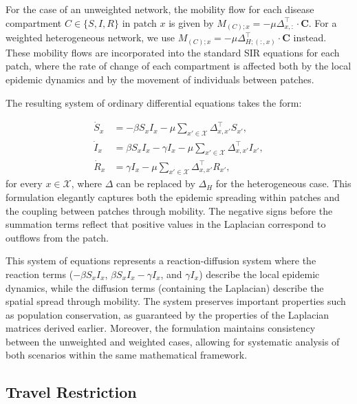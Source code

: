 For the case of an unweighted network, the mobility flow for each disease compartment $C \in \{S, I, R\}$ in patch $x$ is given by $M_{(C);x} = -\mu \Delta_{x,:}^{\top} \cdot \mathbf{C}$. For a weighted heterogeneous network, we use $M_{(C);x} = -\mu \Delta_{H;(:,x)}^{\top} \cdot \mathbf{C}$ instead. These mobility flows are incorporated into the standard SIR equations for each patch, where the rate of change of each compartment is affected both by the local epidemic dynamics and by the movement of individuals between patches.

The resulting system of ordinary differential equations takes the form:

\begin{equation}
\begin{aligned}
    \dot{S}_{x} &= -\beta S_{x} I_{x} - \mu \sum_{x' \in \mathcal{X}} \Delta_{x,x'}^{\top} S_{x'}, \\
    \dot{I}_{x} &= \beta S_{x} I_{x} - \gamma I_{x} - \mu \sum_{x' \in \mathcal{X}} \Delta_{x,x'}^{\top} I_{x'}, \\
    \dot{R}_{x} &= \gamma I_{x} - \mu \sum_{x' \in \mathcal{X}} \Delta_{x,x'}^{\top} R_{x'},
\end{aligned}
\label{eq: SIR M}
\end{equation}
for every $x \in \mathcal{X}$, where $\Delta$ can be replaced by $\Delta_H$ for the heterogeneous case. This formulation elegantly captures both the epidemic spreading within patches and the coupling between patches through mobility. The negative signs before the summation terms reflect that positive values in the Laplacian correspond to outflows from the patch.

This system of equations represents a reaction-diffusion system where the reaction terms ($-\beta S_{x} I_{x}$, $\beta S_{x} I_{x} - \gamma I_{x}$, and $\gamma I_{x}$) describe the local epidemic dynamics, while the diffusion terms (containing the Laplacian) describe the spatial spread through mobility. The system preserves important properties such as population conservation, as guaranteed by the properties of the Laplacian matrices derived earlier. Moreover, the formulation maintains consistency between the unweighted and weighted cases, allowing for systematic analysis of both scenarios within the same mathematical framework.


\subsection{Travel Restriction} %

